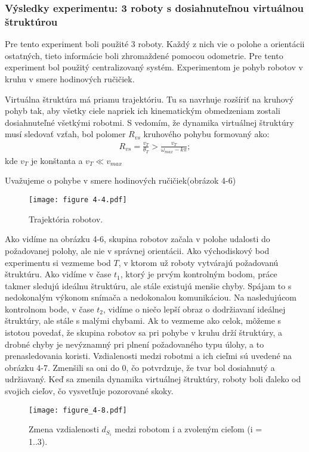 \subsubsection{Výsledky experimentu: 3 roboty s dosiahnuteľnou virtuálnou štruktúrou }
Pre tento experiment boli použité 3 roboty. Každý z nich vie o polohe a orientácii ostatných, tieto informácie boli zhromaždené pomocou odometrie. Pre tento experiment bol použitý centralizovaný systém. Experimentom je pohyb robotov v kruhu v smere hodinových ručičiek.
\vspace{3mm}

\justifying
\noindent 
Virtuálna štruktúra má priamu trajektóriu. Tu sa navrhuje rozšíriť na kruhový pohyb tak, aby všetky ciele napriek ich kinematickým obmedzeniam zostali dosiahnuteľné všetkými robotmi. S vedomím, že dynamika virtuálnej štruktúry musí sledovať vzťah, bol polomer $R_{vs}$ kruhového pohybu formovaný ako:
\begin{gather}\label{r:5}
    R_{vs} = \frac{v_T}{\theta_T} > \frac{v_T}{\omega_{max} - k \pi};
\end{gather}
kde $v_T$ je konštanta a $v_T \ll v_{max}$


\justifying
\noindent 
Uvažujeme o pohybe v smere hodinových ručičiek(obrázok 4-6)
\begin{figure}[ht!]
    \centering
    \texttt{[image: figure 4-4.pdf]}
    \caption{Trajektória robotov.}
    \label{o:44}
\end{figure}

\justifying
\noindent 
Ako vidíme na obrázku 4-6, skupina robotov začala v polohe udalosti do požadovanej polohy, ale nie v správnej orientácii. Ako východiskový bod experimentu si vezmeme bod $T$, v ktorom už roboty vytvárajú požadovanú štruktúru. Ako vidíme v čase $t_1$, ktorý je prvým kontrolným bodom, práce takmer sledujú ideálnu štruktúru,
ale stále existujú menšie chyby. Spájam to s nedokonalým výkonom snímača a nedokonalou komunikáciou. Na nasledujúcom kontrolnom bode, v čase $t_2$, vidíme o niečo lepší obraz o dodržiavaní ideálnej štruktúry, ale stále s malými chybami. Ak to vezmeme ako celok, môžeme s istotou povedať, že skupina robotov sa pri pohybe v kruhu drží štruktúry, a drobné chyby je nevýznamný pri plnení požadovaného typu úlohy, a to prenasledovania koristi. Vzdialenosti medzi robotmi a ich cieľmi sú uvedené na obrázku 4-7. Zmenšili sa oni do 0, čo potvrdzuje, že tvar bol dosiahnutý a udržiavaný. Keď sa zmenila dynamika virtuálnej štruktúry, roboty boli ďaleko od svojich cieľov, čo vysvetľuje pozorované skoky.
\begin{figure}[ht!]
    \centering
    \texttt{[image: figure\_4-8.pdf]}
    \caption{Zmena vzdialenosti $d_{S_i}$ medzi robotom i a zvoleným cieľom (i = 1..3).}
    \label{o:44}
\end{figure}

